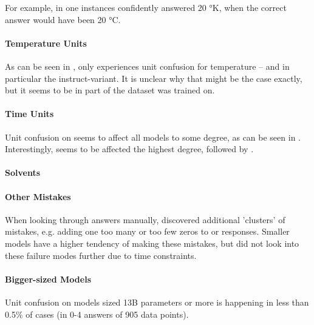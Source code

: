 For example, in one instances  confidently answered 20 °K, when the correct answer would have been 20 °C.

\paragraph{Temperature Units}
As can be seen in , only  experiences unit confusion for temperature -- and in particular the instruct-variant.
It is unclear why that might be the case exactly, but it seems to be in part of the dataset  was trained on.

\paragraph{Time Units}
Unit confusion on \ttime seems to affect all models to some degree, as can be seen in .
Interestingly,  seems to be affected the highest degree, followed by .


\paragraph{Solvents}\label{par:solv}

\paragraph{Other Mistakes}
When looking through answers manually,  discovered additional 'clusters' of mistakes, e.g. adding one too many or too few zeros to \ttime or \ttemp responses.
Smaller models have a higher tendency of making these mistakes, but  did not look into these failure modes further due to time constraints.


\paragraph{Bigger-sized Models}
Unit confusion on models sized 13B parameters or more is happening in less than 0.5\% of cases (in 0-4 answers of 905 data points).



